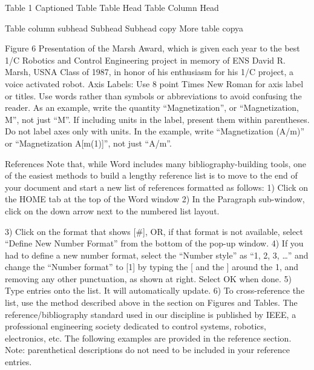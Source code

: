 Table 1 Captioned Table
Table Head
Table Column Head

Table column subhead
Subhead
Subhead
copy
More table copya




Figure 6 Presentation of the Marsh Award, which is given each year to the best 1/C  Robotics and Control Engineering project in memory of ENS David R.  Marsh, USNA Class of 1987, in honor of his enthusiasm for his 1/C project, a voice activated robot.
Axis Labels: Use 8 point Times New Roman for axis label or titles. Use words rather than symbols or abbreviations to avoid confusing the reader. As an example, write the quantity “Magnetization”, or “Magnetization, M”, not just “M”. If including units in the label, present them within parentheses. Do not label axes only with units. In the example, write “Magnetization (A/m)” or “Magnetization {A[m(1)]}”, not just “A/m”. 

References
Note that, while Word includes many bibliography-building tools, one of the easiest methods to build a lengthy reference list is to move to the end of your document and start a new list of references formatted as follows:
1)  Click on the HOME tab at the top of the Word window
2)  In the Paragraph sub-window, click on the down arrow next to the numbered list layout.


3)  Click on the format that shows [#], OR, if that format is not available, select “Define New Number Format” from the bottom of the pop-up window.
4)  If you had to define a new number format, select the “Number style” as “1, 2, 3, …” and change the “Number format” to [1] by typing the [ and the ] around the 1, and removing any other punctuation, as shown at right.  Select OK when done.
5)  Type entries onto the list.  It will automatically update.
6)  To cross-reference the list, use the method described above in the section on Figures and Tables.
The reference/bibliography standard used in our discipline is published by IEEE, a professional engineering society dedicated to control systems, robotics, electronics, etc.  The following examples are provided in the reference section.  Note: parenthetical descriptions do not need to be included in your reference entries. 


